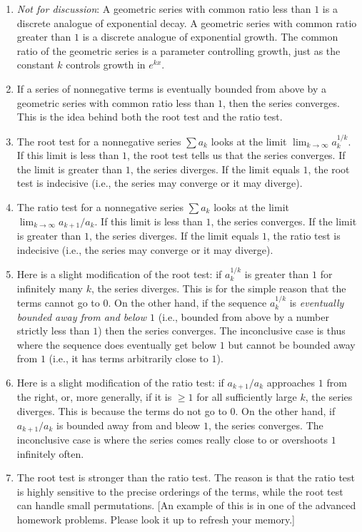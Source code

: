 \documentclass[10pt]{amsart}
\begin{document}
\begin{enumerate}
\item {\em Not for discussion}: A geometric series with common ratio
  less than $1$ is a discrete analogue of exponential decay. A
  geometric series with common ratio greater than $1$ is a discrete
  analogue of exponential growth. The common ratio of the geometric
  series is a parameter controlling growth, just as the constant
  $k$ controls growth in $e^{kx}$.
\item If a series of nonnegative terms is eventually bounded from
  above by a geometric series with common ratio less than $1$, then
  the series converges. This is the idea behind both the root test and
  the ratio test.
\item The root test for a nonnegative series $\sum a_k$ looks at the
  limit $\lim_{k \to \infty} a_k^{1/k}$. If this limit is less than
  $1$, the root test tells us that the series converges. If the limit
  is greater than $1$, the series diverges. If the limit equals $1$,
  the root test is indecisive (i.e., the series may converge or it may
  diverge).
\item The ratio test for a nonnegative series $\sum a_k$ looks at the
  limit $\lim_{k \to \infty} a_{k+1}/a_k$. If this limit is less than
  $1$, the series converges. If the limit is greater than $1$, the
  series diverges. If the limit equals $1$, the ratio test is
  indecisive (i.e., the series may converge or it may diverge).
\item Here is a slight modification of the root test: if $a_k^{1/k}$
  is greater than $1$ for infinitely many $k$, the series
  diverges. This is for the simple reason that the terms cannot go to
  $0$. On the other hand, if the sequence $a_k^{1/k}$ is {\em
  eventually bounded away from and below $1$} (i.e., bounded from
  above by a number strictly less than $1$) then the series
  converges. The inconclusive case is thus where the sequence does
  eventually get below $1$ but cannot be bounded away from $1$ (i.e.,
  it has terms arbitrarily close to $1$).
\item Here is a slight modification of the ratio test: if
  $a_{k+1}/a_k$ approaches $1$ from the right, or, more generally, if
  it is $\ge 1$ for all sufficiently large $k$, the series
  diverges. This is because the terms do not go to $0$. On the other
  hand, if $a_{k+1}/a_k$ is bounded away from and bleow $1$, the
  series converges. The inconclusive case is where the series comes
  really close to or overshoots $1$ infinitely often.
\item The root test is stronger than the ratio test. The reason is
  that the ratio test is highly sensitive to the precise orderings of
  the terms, while the root test can handle small permutations. [An
  example of this is in one of the advanced homework problems. Please
  look it up to refresh your memory.]
\end{enumerate}
\end{document}

